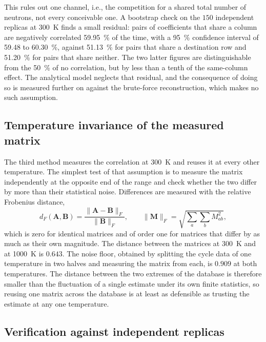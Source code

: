 This rules out one channel, i.e., the competition for a shared total number of
neutrons, not every conceivable one. A bootstrap check on the $150$ independent replicas at
\SI{300}{K} finds a small residual: pairs of coefficients that share a
column are negatively correlated \SI{59.95}{\percent} of the time, with a
\SI{95}{\percent} confidence interval of 59.48 to \SI{60.30}{\percent}, against
\SI{51.13}{\percent} for pairs that share a destination row and
\SI{51.20}{\percent} for pairs that share neither. The two latter figures are
distinguishable from the \SI{50}{\percent} of no correlation, but by less than
a tenth of the same-column effect. The analytical model neglects that residual,
and the consequence of doing so is measured further on
against the brute-force reconstruction, which makes no such assumption.

\subsection{Temperature invariance of the measured matrix}\label{cr:sec:invariance}

The third method measures the correlation at \SI{300}{K} and reuses it at every
other temperature. The simplest test of that assumption is to measure the
matrix independently at the opposite end of the range and check whether the
two differ by more than their statistical noise. Differences are
measured with the relative Frobenius distance,
%
\begin{equation}
  d_F(\mathbf A,\mathbf B) = \frac{\|\mathbf A-\mathbf B\|_F}{\|\mathbf B\|_F},
  \qquad
  \|\mathbf M\|_F = \sqrt{\sum_{a}\sum_{b} M_{ab}^2},
  \label{cr:eq:frobenius}
\end{equation}
%
which is zero for identical matrices and of order one for matrices that differ
by as much as their own magnitude. The distance between the matrices at
\SI{300}{K} and at \SI{1000}{K} is $0.643$. The noise floor, obtained by
splitting the cycle data of one temperature in two halves and measuring the
matrix from each, is $0.909$ at both temperatures. The distance between the two
extremes of the database is therefore smaller than the fluctuation of a single
estimate under its own finite statistics, so reusing one matrix across the
database is at least as defensible as trusting the estimate at any one
temperature.

\subsection{Verification against independent replicas}\label{cr:sec:validation}

